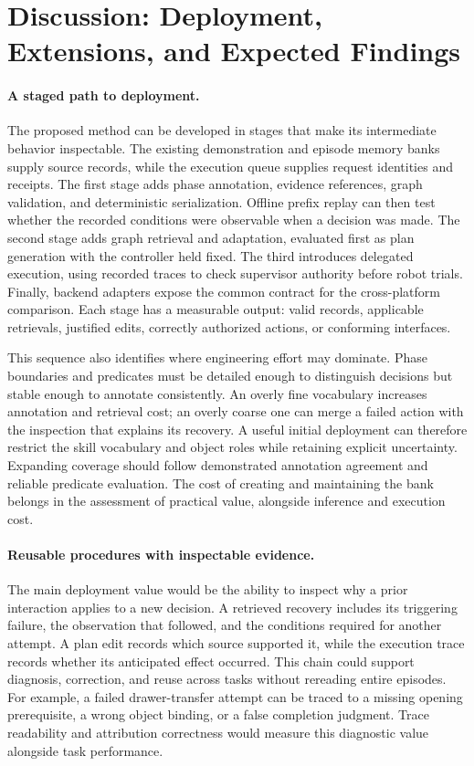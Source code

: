 \section{Discussion: Deployment, Extensions, and Expected Findings}
\label{sec:discussion}

\paragraph{A staged path to deployment.}
The proposed method can be developed in stages that make its intermediate behavior inspectable. The existing demonstration and episode memory banks supply source records, while the execution queue supplies request identities and receipts. The first stage adds phase annotation, evidence references, graph validation, and deterministic serialization. Offline prefix replay can then test whether the recorded conditions were observable when a decision was made. The second stage adds graph retrieval and adaptation, evaluated first as plan generation with the controller held fixed. The third introduces delegated execution, using recorded traces to check supervisor authority before robot trials. Finally, backend adapters expose the common contract for the cross-platform comparison. Each stage has a measurable output: valid records, applicable retrievals, justified edits, correctly authorized actions, or conforming interfaces.

This sequence also identifies where engineering effort may dominate. Phase boundaries and predicates must be detailed enough to distinguish decisions but stable enough to annotate consistently. An overly fine vocabulary increases annotation and retrieval cost; an overly coarse one can merge a failed action with the inspection that explains its recovery. A useful initial deployment can therefore restrict the skill vocabulary and object roles while retaining explicit uncertainty. Expanding coverage should follow demonstrated annotation agreement and reliable predicate evaluation. The cost of creating and maintaining the bank belongs in the assessment of practical value, alongside inference and execution cost.

\paragraph{Reusable procedures with inspectable evidence.}
The main deployment value would be the ability to inspect why a prior interaction applies to a new decision. A retrieved recovery includes its triggering failure, the observation that followed, and the conditions required for another attempt. A plan edit records which source supported it, while the execution trace records whether its anticipated effect occurred. This chain could support diagnosis, correction, and reuse across tasks without rereading entire episodes. For example, a failed drawer-transfer attempt can be traced to a missing opening prerequisite, a wrong object binding, or a false completion judgment. Trace readability and attribution correctness would measure this diagnostic value alongside task performance.

